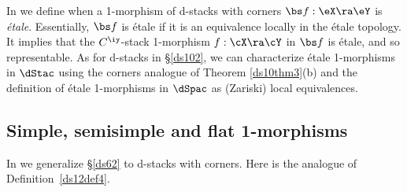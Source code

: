 \documentclass{article}
\begin{document}
In \cite[\S 11.4]{Joyc6} we define when a 1-morphism of d-stacks
with corners $\bs f:\eX\ra\eY$ is {\it \'etale}. Essentially, $\bs f$ is
\'etale if it is an equivalence locally in the \'etale topology. It
implies that the $C^\iy$-stack 1-morphism $f:\cX\ra\cY$ in $\bs f$
is \'etale, and so representable. As for d-stacks in \S\ref{ds102},
we can characterize \'etale 1-morphisms in $\dStac$ using the
corners analogue of Theorem \ref{ds10thm3}(b) and the definition of
\'etale 1-morphisms in $\dSpac$ as (Zariski) local
equivalences.

\subsection{Simple, semisimple and flat 1-morphisms}
\label{ds133}

In \cite[\S 11.3]{Joyc6} we generalize \S\ref{ds62} to d-stacks with
corners. Here is the analogue of Definition~\ref{ds12def4}.
\end{document}
